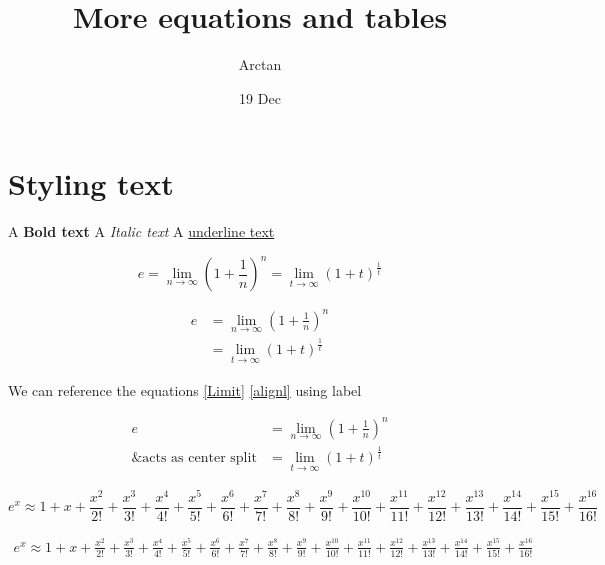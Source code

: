 \documentclass{article}
\title{More equations and tables}
\author{Arctan}
\date{19 Dec}
\begin{document}
\maketitle

\section{Styling text}

A \textbf{Bold text}
A \textit{Italic text}
A \underline{underline text}

    \begin{equation}
    \label{Limit}
        e = \lim_{n\to\infty}\left(1+\frac{1}{n}\right)^n
          = \lim_{t\to\infty}(1+t)^\frac{1}{t}
    \end{equation}

    \begin{align}
    \label{alignl}
        e& = \lim_{n\to\infty}\left(1+\frac{1}{n}\right)^n \\ 
          &= \lim_{t\to\infty}(1+t)^\frac{1}{t}
    \end{align}

    We can reference the equations \ref{Limit} \ref{alignl} using label 

    \begin{equation}
    \begin{split}
        e &= \lim_{n\to\infty}\left(1+\frac{1}{n}\right)^n \\
        \text{\& acts as center split}  &= \lim_{t\to\infty}(1+t)^\frac{1}{t}
    \end{split} 
    \end{equation}

    \begin{equation}
        e^x \approx 1 + x + \frac{x^2}{2!} + \frac{x^3}{3!}+ \frac{x^4}{4!}+ \frac{x^5}{5!}+ \frac{x^6}{6!}+ \frac{x^7}{7!}+ \frac{x^8}{8!}+ \frac{x^9}{9!}+ \frac{x^10}{10!}+ \frac{x^11}{11!}+ \frac{x^12}{12!}+ \frac{x^13}{13!}+ \frac{x^14}{14!}+ \frac{x^15}{15!}+ \frac{x^16}{16!}
    \end{equation}

    \begin{multline}
        e^x \approx 1 + x + \frac{x^2}{2!} + \frac{x^3}{3!}+ \frac{x^4}{4!}+ \frac{x^5}{5!}+ \frac{x^6}{6!}+ \frac{x^7}{7!}+ \frac{x^8}{8!}+ \frac{x^9}{9!}+ \frac{x^10}{10!}+ \frac{x^11}{11!}+ \frac{x^12}{12!}+ \frac{x^13}{13!}+ \frac{x^14}{14!}+ \frac{x^15}{15!}+ \frac{x^16}{16!}
    \end{multline}
\end{document}
